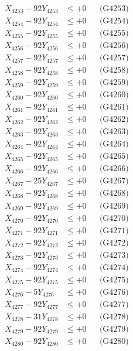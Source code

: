 \documentclass[a4paper,10pt]{article}
\begin{document}
{\begin{align}
X_{4253} - 92Y_{4253} &\leq +0 && \text{(G4253)} \\
X_{4254} - 92Y_{4254} &\leq +0 && \text{(G4254)} \\
X_{4255} - 92Y_{4255} &\leq +0 && \text{(G4255)} \\
X_{4256} - 92Y_{4256} &\leq +0 && \text{(G4256)} \\
X_{4257} - 92Y_{4257} &\leq +0 && \text{(G4257)} \\
X_{4258} - 92Y_{4258} &\leq +0 && \text{(G4258)} \\
X_{4259} - 92Y_{4259} &\leq +0 && \text{(G4259)} \\
X_{4260} - 92Y_{4260} &\leq +0 && \text{(G4260)} \\
\allowbreak
X_{4261} - 92Y_{4261} &\leq +0 && \text{(G4261)} \\
X_{4262} - 92Y_{4262} &\leq +0 && \text{(G4262)} \\
X_{4263} - 92Y_{4263} &\leq +0 && \text{(G4263)} \\
X_{4264} - 92Y_{4264} &\leq +0 && \text{(G4264)} \\
X_{4265} - 92Y_{4265} &\leq +0 && \text{(G4265)} \\
X_{4266} - 92Y_{4266} &\leq +0 && \text{(G4266)} \\
X_{4267} - 25Y_{4267} &\leq +0 && \text{(G4267)} \\
X_{4268} - 92Y_{4268} &\leq +0 && \text{(G4268)} \\
X_{4269} - 92Y_{4269} &\leq +0 && \text{(G4269)} \\
X_{4270} - 92Y_{4270} &\leq +0 && \text{(G4270)} \\
\allowbreak
X_{4271} - 92Y_{4271} &\leq +0 && \text{(G4271)} \\
X_{4272} - 92Y_{4272} &\leq +0 && \text{(G4272)} \\
X_{4273} - 92Y_{4273} &\leq +0 && \text{(G4273)} \\
X_{4274} - 92Y_{4274} &\leq +0 && \text{(G4274)} \\
X_{4275} - 92Y_{4275} &\leq +0 && \text{(G4275)} \\
X_{4276} - 5Y_{4276} &\leq +0 && \text{(G4276)} \\
X_{4277} - 92Y_{4277} &\leq +0 && \text{(G4277)} \\
X_{4278} - 31Y_{4278} &\leq +0 && \text{(G4278)} \\
X_{4279} - 92Y_{4279} &\leq +0 && \text{(G4279)} \\
X_{4280} - 92Y_{4280} &\leq +0 && \text{(G4280)} \\
\allowbreak

\end{align}}
\end{document}
